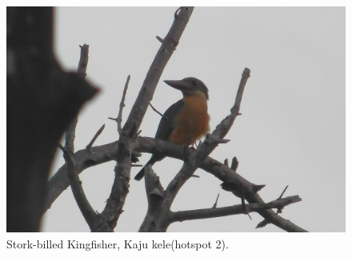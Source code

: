 \begin{figure}[!htpb]
    \centering
    \includegraphics[width=\linewidth]{Figures/stork-billed.JPG}
    \caption[]{Stork-billed Kingfisher, Kaju kele(hotspot 2).}
    \label{fig:figure-01}
\end{figure}
